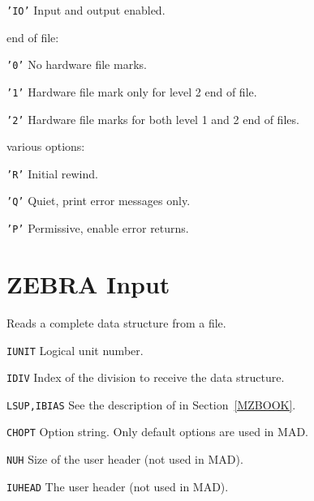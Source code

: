 \begin{mylist}
\begin{mylist}
\begin{mylist}
        \item[\tt 'IO']
            Input and output enabled.
        \end{mylist}
    \item[end of file:]
        \begin{mylist}
        \item[\tt '0']
            No hardware file marks.
        \item[\tt '1']
            Hardware file mark only for level 2 end of file.
        \item[\tt '2']
            Hardware file marks for both level 1 and 2 end of files.
        \end{mylist}
    \item[various options:]
        \begin{mylist}
        \item[\tt 'R']
            Initial rewind.
        \item[\tt 'Q']
            Quiet, print error messages only.
        \item[\tt 'P']
            Permissive, enable error returns.
        \end{mylist}
    \end{mylist}
\end{mylist}

\section{ZEBRA Input}
\label{FZIN}
Reads a complete data structure from a file.
\begin{mylist}
\item[\tt IUNIT]
    Logical unit number.
\item[\tt IDIV]
    Index of the division to receive the data structure.
\item[\tt LSUP,IBIAS]
    See the description of  in Section~\ref{MZBOOK}.
\item[\tt CHOPT]
    Option string. Only default options are used in MAD.
\item[\tt NUH]
    Size of the user header (not used in MAD).
\item[\tt IUHEAD]
    The user header (not used in MAD).
\end{mylist}


